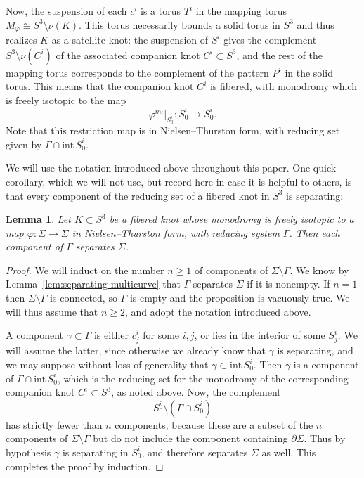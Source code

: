 \documentclass[11pt]{amsart}
\newtheorem {lemma}[theorem]{Lemma}
\numberwithin{equation}{section}
\numberwithin{theorem}{section}
\theoremstyle{definition}
\renewcommand{\phi}{\varphi}
\begin{document}
Now, the suspension of each $c^i$ is a torus $T^i$ in the mapping torus $M_\varphi \cong S^3\setminus \nu(K)$. This torus necessarily bounds a solid torus in $S^3$ and thus realizes $K$ as a satellite knot: the suspension of $S^i$ gives the complement $S^3 \setminus \nu(C^i)$ of the associated companion knot $C^i \subset S^3$, and the rest of the mapping torus corresponds to the complement of the pattern $P^i
$ in the solid torus. This means that the companion  knot $C^i$ is fibered, with monodromy which is freely isotopic to the map
\[ \varphi^{m_i}|_{S^i_0} : S^i_0 \to S^i_0. \] Note that this restriction map is in Nielsen--Thurston form, with reducing set given by $\Gamma\cap \textrm{int} \,S^i_0$. 

We will use the notation introduced above throughout this paper. One quick corollary, which we will not use, but record here in case it is helpful to others, is that every component of the reducing set of a fibered knot in $S^3$ is separating:

\begin{lemma} \label{lem:reducing-separating}
Let $K \subset S^3$ be a fibered knot whose monodromy is freely isotopic to a map $\phi: \Sigma \to \Sigma$ in Nielsen--Thurston form, with reducing system $\Gamma$.  Then each component of $\Gamma$ separates $\Sigma$.
\end{lemma}

\begin{proof}
We will induct on the number $n \geq 1$ of components of $\Sigma \setminus \Gamma$.  We know by Lemma~\ref{lem:separating-multicurve} that $\Gamma$ separates $\Sigma$ if it is nonempty.  If $n=1$ then $\Sigma \setminus \Gamma$ is connected, so $\Gamma$ is empty and the proposition is vacuously true.  We will thus assume that $n \geq 2$, and adopt the notation introduced above.

A component  $\gamma\subset\Gamma$ is either $c^i_j$ for some $i,j$, or lies in the interior of some $S^i_j$.  We will assume the latter, since otherwise we already know that $\gamma$ is separating, and we may suppose without loss of generality that $\gamma\subset \textrm{int} \,S^i_0$. 
Then $\gamma$ is a component of $\Gamma\cap \textrm{int} \,S^i_0$, which is the reducing set for the monodromy of the corresponding companion knot $C^i\subset S^3$, as noted above. Now, the complement
\[ S^i_0 \setminus (\Gamma \cap S^i_0) \]
has strictly fewer than $n$ components, because these are a subset of the $n$ components of $\Sigma \setminus \Gamma$ but  do not include the component containing $\partial \Sigma$.  Thus by hypothesis $\gamma$ is separating in $S^i_0$, and therefore separates $\Sigma$ as well.  This completes the proof by induction.
\end{proof}
\end{document}
